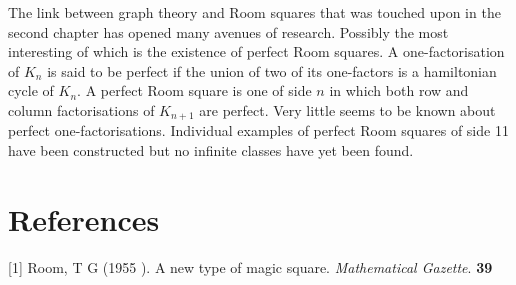 \documentclass[
  12pt,
  a4paper]{book}
\begin{document}
The link between graph theory and Room squares that was touched upon in
the second chapter has opened many avenues of research. Possibly the
most interesting of which is the existence of perfect Room squares. A
one-factorisation of \(K_n\) is said to be perfect if the union of two
of its one-factors is a hamiltonian cycle of \(K_n\). A perfect Room
square is one of side \(n\) in which both row and column factorisations
of \(K_{n+1}\) are perfect. Very little seems to be known about perfect
one-factorisations. Individual examples of perfect Room squares of side
11 have been constructed but no infinite classes have yet been found.

\hypertarget{references}{%
\chapter*{References}\label{references}}

\hypertarget{refs}{}
\leavevmode\hypertarget{ref-room_new_1955}{}%
{[}1{]} Room, T G (1955 ). A new type of magic square.
\emph{Mathematical Gazette}. \textbf{39}

\backmatter
\end{document}
